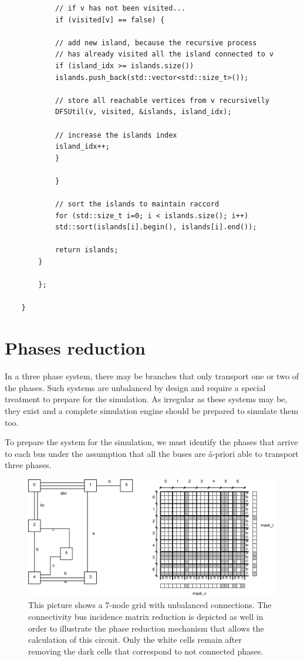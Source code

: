 \documentclass[nols,a4paper,twoside,notoc,fleqn]{tufte-book}
\begin{document}
{\begin{verbatim}
			// if v has not been visited...
			if (visited[v] == false) {
			
			// add new island, because the recursive process 
			// has already visited all the island connected to v
			if (island_idx >= islands.size())
			islands.push_back(std::vector<std::size_t>());
			
			// store all reachable vertices from v recursivelly
			DFSUtil(v, visited, &islands, island_idx);
			
			// increase the islands index
			island_idx++;
			}
			
			}
			
			// sort the islands to maintain raccord
			for (std::size_t i=0; i < islands.size(); i++)
			std::sort(islands[i].begin(), islands[i].end());
			
			return islands;
		}
		
		};
	
	}
	\end{verbatim}
}



\section{Phases reduction} \label{phase_reduction}

In a three phase system, there may be branches that only transport one or two of the phases. Such systems are unbalanced by design and require a special treatment to prepare for the simulation. As irregular as these systems may be, they exist and a complete simulation engine should be prepared to simulate them too.

To prepare the system for the simulation, we must identify the phases that arrive to each bus under the assumption that all the buses are \'a-priori able to transport three phases.

\begin{figure}[h!]
	\centering
	\includegraphics[width=0.99\linewidth]{img/phase_reduction.eps}
	\caption{This picture shows a 7-node grid with unbalanced connections. The connectivity bus incidence matrix reduction is depicted as well in order to illustrate the phase reduction mechanism that allows the calculation of this circuit. Only the white cells remain after removing the dark cells that correspond to not connected phases.}
	\label{fig:phase_reduction}
\end{figure}
\end{document}

